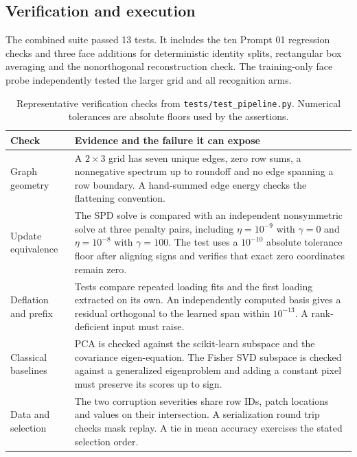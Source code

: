 \subsection{Verification and execution}

The combined suite passed 13 tests. It includes the ten Prompt 01 regression checks and three face additions for deterministic identity splits, rectangular box averaging and the nonorthogonal reconstruction check. The training-only face probe independently tested the larger grid and all recognition arms.

\begin{table}[H]\small
\caption{Representative verification checks from \texttt{tests/test\_pipeline.py}. Numerical tolerances are absolute floors used by the assertions.}
\label{tab:checks}
\begin{tabularx}{\linewidth}{@{}P{33mm}Y@{}}
\toprule
Check & Evidence and the failure it can expose\\
\midrule
Graph geometry & A $2\times3$ grid has seven unique edges, zero row sums, a nonnegative spectrum up to roundoff and no edge spanning a row boundary. A hand-summed edge energy checks the flattening convention.\\
Update equivalence & The SPD solve is compared with an independent nonsymmetric solve at three penalty pairs, including $\eta=10^{-9}$ with $\gamma=0$ and $\eta=10^{-8}$ with $\gamma=100$. The test uses a $10^{-10}$ absolute tolerance floor after aligning signs and verifies that exact zero coordinates remain zero.\\
Deflation and prefix & Tests compare repeated loading fits and the first loading extracted on its own. An independently computed basis gives a residual orthogonal to the learned span within $10^{-13}$. A rank-deficient input must raise.\\
Classical baselines & PCA is checked against the scikit-learn subspace and the covariance eigen-equation. The Fisher SVD subspace is checked against a generalized eigenproblem and adding a constant pixel must preserve its scores up to sign.\\
Data and selection & The two corruption severities share row IDs, patch locations and values on their intersection. A serialization round trip checks mask replay. A tie in mean accuracy exercises the stated selection order.\\
\bottomrule
\end{tabularx}
\end{table}

